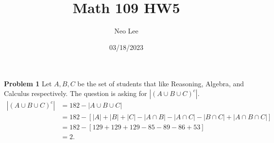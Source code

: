 \documentclass{article}
\title{Math 109 HW5}
\author{Neo Lee}
\date{03/18/2023}
\begin{document}
 

\maketitle 
\textbf{Problem 1}
Let $A, B, C$ be the set of students that like Reasoning, Algebra, and Calculus respectively.
The question is asking for $|(A\cup B \cup C)^c|$.
\begin{align}
    |(A\cup B \cup C)^c| & = 182 - |A\cup B \cup C| \nonumber\\
    & = 182-\left[|A|+|B|+|C|-|A\cap B|-|A\cap C|-|B\cap C|+|A\cap B\cap C|\right] \nonumber\\
    & = 182 - \left[129 + 129 + 129 -85 -89-86+53\right] \nonumber\\
    & =2.\nonumber
\end{align}
\bigbreak

\end{document}
